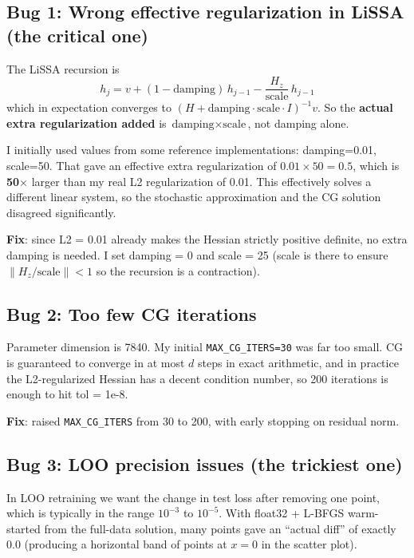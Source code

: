 \documentclass[a4paper,11pt]{article}
\begin{document}
\subsection*{Bug 1: Wrong effective regularization in LiSSA (the critical one)}

The LiSSA recursion is
\[
h_j = v + (1 - \text{damping}) \, h_{j-1} - \frac{H_z}{\text{scale}} \, h_{j-1}
\]
which in expectation converges to $(H + \text{damping} \cdot \text{scale} \cdot I)^{-1} v$.
So the \textbf{actual extra regularization added} is $\text{damping} \times \text{scale}$,
not damping alone.

I initially used values from some reference implementations: damping=0.01, scale=50.
That gave an effective extra regularization of $0.01 \times 50 = 0.5$,
which is \textbf{50$\times$} larger than my real L2 regularization of 0.01.
This effectively solves a different linear system, so the stochastic approximation
and the CG solution disagreed significantly.

\textbf{Fix}: since L2 = 0.01 already makes the Hessian strictly positive definite,
no extra damping is needed. I set damping = 0 and scale = 25
(scale is there to ensure $\|H_z / \text{scale}\| < 1$ so the recursion is a contraction).

\subsection*{Bug 2: Too few CG iterations}

Parameter dimension is 7840. My initial \texttt{MAX\_CG\_ITERS=30} was far too small.
CG is guaranteed to converge in at most $d$ steps in exact arithmetic,
and in practice the L2-regularized Hessian has a decent condition number,
so 200 iterations is enough to hit tol = 1e-8.

\textbf{Fix}: raised \texttt{MAX\_CG\_ITERS} from 30 to 200, with early stopping on residual norm.

\subsection*{Bug 3: LOO precision issues (the trickiest one)}

In LOO retraining we want the change in test loss after removing one point,
which is typically in the range $10^{-3}$ to $10^{-5}$.
With float32 + L-BFGS warm-started from the full-data solution,
many points gave an ``actual diff'' of exactly 0.0
(producing a horizontal band of points at $x = 0$ in the scatter plot).
\end{document}
